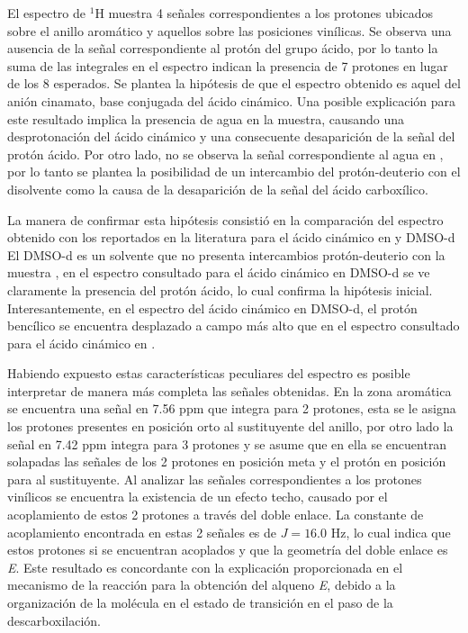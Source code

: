 \documentclass[fleqn,11pt]{SelfArx}
\begin{document}
El espectro de $^1$H muestra 4 señales correspondientes a los protones ubicados sobre el anillo aromático y aquellos sobre las posiciones vinílicas. Se observa una ausencia de la señal correspondiente al protón del grupo ácido, por lo tanto la suma de las integrales en el espectro indican la presencia de 7 protones en lugar de los 8 esperados. Se plantea la hipótesis de que el espectro obtenido es aquel del anión cinamato, base conjugada del ácido cinámico. Una posible explicación para este resultado implica la presencia de agua en la muestra, causando una desprotonación del ácido cinámico y una consecuente desaparición de la señal del protón ácido. Por otro lado, no se observa la señal correspondiente al agua en , por lo tanto se plantea la posibilidad de un intercambio del protón-deuterio con el disolvente como la causa de la desaparición de la señal del ácido carboxílico.

La manera de confirmar esta hipótesis consistió en la comparación del espectro obtenido con los reportados en la literatura para el ácido cinámico en  y DMSO-d \cite{Liu2016, Yedage2017} El DMSO-d es un solvente que no presenta intercambios protón-deuterio con la muestra \cite{clayden_greeves_warren_2012}, en el espectro consultado para el ácido cinámico en DMSO-d se ve claramente la presencia del protón ácido, lo cual confirma la hipótesis inicial. Interesantemente, en el espectro del ácido cinámico en DMSO-d, el protón bencílico se encuentra desplazado a campo más alto que en el espectro consultado para el ácido cinámico en . 

Habiendo expuesto estas características peculiares del espectro es posible interpretar de manera más completa las señales obtenidas. En la zona aromática se encuentra una señal en 7.56 ppm que integra para 2 protones, esta se le asigna los protones presentes en posición orto al sustituyente del anillo, por otro lado la señal en 7.42 ppm integra para 3 protones y se asume que en ella se encuentran solapadas las señales de los 2 protones en posición meta y el protón en posición para al sustituyente. Al analizar las señales correspondientes a los protones vinílicos se encuentra la existencia de un efecto techo, causado por el acoplamiento de estos 2 protones a través del doble enlace. La constante de acoplamiento encontrada en estas 2 señales es de $J=16.0$ Hz, lo cual indica que estos protones si se encuentran acoplados y que la geometría del doble enlace es \textit{E}. Este resultado es concordante con la explicación proporcionada en el mecanismo de la reacción para la obtención del alqueno \textit{E}, debido a la organización de la molécula en el estado de transición en el paso de la descarboxilación.
\end{document}
